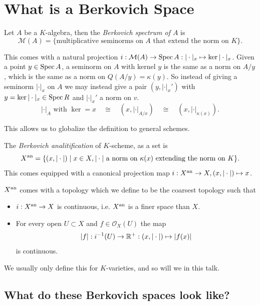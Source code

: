\documentclass[a4paper]{article}
\begin{document}
\section{What is a Berkovich Space} \label{sec:what_is_a_berkovich_space}
\begin{definition}
	Let $A$ be a $K$-algebra, then the \emph{Berkovich spectrum of $A$} 
	is \[
		\mathcal{M} (A) =  \{\text{multiplicative seminorms on }A \text{ that extend the norm on } K\}  
	.\] 
\end{definition}
This comes with a natural projection $i: \mathcal{M} (A) \to \operatorname{Spec} A : |\cdot |_x \mapsto \ker |\cdot |_x$. 
Given a point $y \in \operatorname{Spec} A$, a seminorm on $A$ with kernel $y$ is the same as a norm on $A / y$, which is the same as a norm on $Q(A/ y) = \kappa(y)$. 
So instead of giving a seminorm $|\cdot |_x$ on $A$ we may instead give a pair $(y, |\cdot |_x')$ with $y = \ker|\cdot |_x \in \operatorname{Spec} R$ and $|\cdot |_x'$ a norm on  $v$. 
\[
	|\cdot |_A \text{ with }\ker = x \quad \cong \quad (x, |\cdot |_{A / x}) \quad \cong \quad (x, |\cdot |_{\kappa(x)})
.\] 

This allows us to globalize the definition to general schemes. 
\begin{definition}\label{def:berkovich_analytification_explicit}
	The \emph{Berkovich analitification} of $K$-scheme, as a set is \[
		X{}^{\text{an}} = \{(x, |\cdot |)  \mid x\in X, |\cdot | \text{ a norm on } \kappa(x) \text{ extending the norm on }K \} 
	.\] 
	This comes equipped with a canonical projection map $i: X{}^{\text{an}} \to X, (x, |\cdot |) \mapsto  x$.
	
	$X{}^{\text{an}} $ comes with a topology which we define to be the coarsest topology such that 
	\begin{itemize}
		\item $i: X{}^{\text{an}} \to X$ is continuous, i.e. $X{}^{\text{an}}$ is a finer space than  $X$. 
		\item For every open $U \subset X$ and $f \in \mathcal{O}_X(U)$ the map  \[
				|f|: i^{-1}(U) \to \mathbb{R}^{+}: (x, |\cdot |) \mapsto  |f(x)|
		\] 
		is continuous.
	\end{itemize}
\end{definition}
We usually only define this for $K$-varieties, and so will we in this talk. 

\subsection{What do these Berkovich spaces look like?} \label{sec:what_do_these_berkovich_spaces_look_like?}
\end{document}
